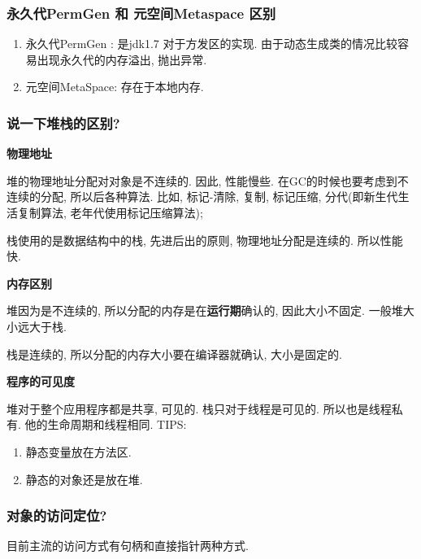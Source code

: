 \documentclass[UTF8]{ctexart}
\begin{document}
\subsubsection{永久代PermGen 和 元空间Metaspace 区别}
\begin{enumerate}
	\item 永久代PermGen : 是jdk1.7 对于方发区的实现. 由于动态生成类的情况比较容易出现永久代的内存溢出, 抛出异常.
	\item 元空间MetaSpace: 存在于本地内存.
\end{enumerate}
\subsubsection{说一下堆栈的区别?}
\textbf{物理地址}
\par
堆的物理地址分配对对象是不连续的. 因此, 性能慢些. 在GC的时候也要考虑到不连续的分配, 所以后各种算法. 比如, 标记-清除, 复制, 标记压缩, 分代(即新生代生活复制算法, 老年代使用标记压缩算法);
\par
栈使用的是数据结构中的栈, 先进后出的原则, 物理地址分配是连续的. 所以性能快.
\par
\textbf{内存区别}
\par
堆因为是不连续的, 所以分配的内存是在\textbf{运行期}确认的, 因此大小不固定. 一般堆大小远大于栈.
\par
栈是连续的, 所以分配的内存大小要在编译器就确认, 大小是固定的.
\par
\textbf{程序的可见度}
\par
堆对于整个应用程序都是共享, 可见的.
栈只对于线程是可见的. 所以也是线程私有. 他的生命周期和线程相同.
TIPS:
\begin{enumerate}
	\item 静态变量放在方法区.
	\item 静态的对象还是放在堆.
\end{enumerate}

\subsubsection{对象的访问定位?}
目前主流的访问方式有句柄和直接指针两种方式.
\end{document}
